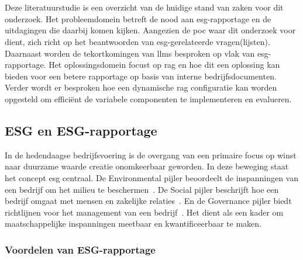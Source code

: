 \chapter{}%
\label{ch:stand-van-zaken}

Deze literatuurstudie is een overzicht van de huidige stand van zaken voor dit onderzoek. Het probleemdomein betreft de nood aan \gls{esg}-rapportage en de uitdagingen die daarbij komen kijken. Aangezien de \gls{poc} waar dit onderzoek voor dient, zich richt op het beantwoorden van \gls{esg}-gerelateerde vragen(lijsten). Daarnaast worden de tekortkomingen van \glspl{llm} besproken op vlak van \gls{esg}-rapportage. Het oplossingsdomein focust op \gls{rag} en hoe dit een oplossing kan bieden voor een betere rapportage op basis van interne bedrijfsdocumenten. Verder wordt er besproken hoe een dynamische \gls{rag} configuratie kan worden opgesteld om efficiënt de variabele componenten te implementeren en evalueren.

\section{ESG en ESG-rapportage}

In de hedendaagse bedrijfsvoering is de overgang van een primaire focus op winst naar duurzame waarde creatie onomkeerbaar geworden. In deze beweging staat het concept \gls{esg} centraal. De Environmental pijler beoordeelt de inspanningen van een bedrijf om het milieu te beschermen~\autocite{Radzi2023}. De Social pijler beschrijft hoe een bedrijf omgaat met mensen en zakelijke relaties~\autocite{Radzi2023}. En de Governance pijler biedt richtlijnen voor het management van een bedrijf~\autocite{Radzi2023}. Het dient als een kader om maatschappelijke inspanningen meetbaar en kwantificeerbaar te maken.

\subsection{Voordelen van ESG-rapportage}

